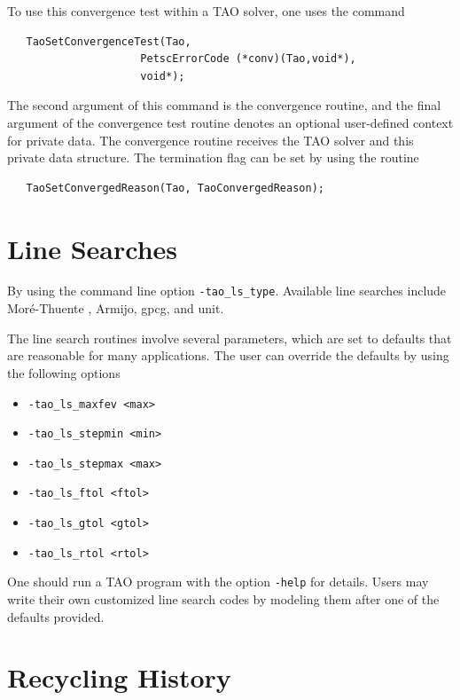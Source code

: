 \documentclass[]{book}
\begin{document}
To use this convergence test within a TAO solver, one uses
the command %
\begin{verbatim}
   TaoSetConvergenceTest(Tao,
                     PetscErrorCode (*conv)(Tao,void*),
                     void*);
\end{verbatim}
\noindent
The second argument of this command is the convergence routine, and the
final argument of the convergence test routine denotes an optional 
user-defined context for private data.  
The convergence routine receives the TAO solver and this private data
structure. 
The termination flag can be set by using the routine
\begin{verbatim}
   TaoSetConvergedReason(Tao, TaoConvergedReason);
\end{verbatim}
\noindent



\section{Line Searches} %
\label{sec_TaoLineSearch}

By using the command line option  {\tt -tao\_ls\_type}.  
Available line searches 
include Mor\'{e}-Thuente \cite{more:92}, Armijo, gpcg, and unit.

The line search routines involve several parameters, which are set
to defaults that are reasonable for many applications.  The user
can override the defaults by using the following options
\begin{itemize}
\item {\tt -tao\_ls\_maxfev <max>}
\item {\tt -tao\_ls\_stepmin <min>}
\item {\tt -tao\_ls\_stepmax <max>}
\item {\tt -tao\_ls\_ftol <ftol>}
\item {\tt -tao\_ls\_gtol <gtol>}
\item {\tt -tao\_ls\_rtol <rtol>}
\end{itemize}

One should run a TAO program with the option 
{\tt -help}
for details.  Users may write their own customized line search codes
by modeling them after one of the defaults provided.

\section{Recycling History} %
\label{sec_TaoRecycleHistory}
\end{document}
